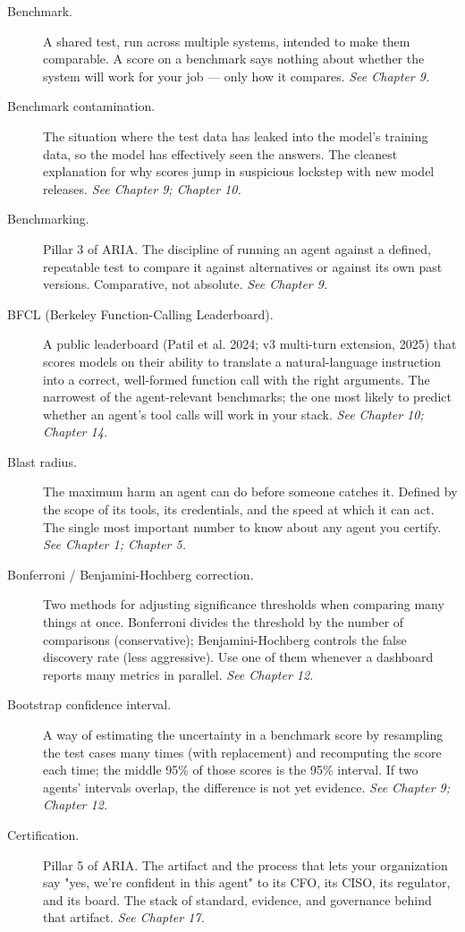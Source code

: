 \begin{description}
  \item[Benchmark.] A shared test, run across multiple systems, intended to make them comparable. A score on a benchmark says nothing about whether the system will work for your job — only how it compares. \textit{See Chapter 9.}
  \item[Benchmark contamination.] The situation where the test data has leaked into the model's training data, so the model has effectively seen the answers. The cleanest explanation for why scores jump in suspicious lockstep with new model releases. \textit{See Chapter 9; Chapter 10.}
  \item[Benchmarking.] Pillar 3 of ARIA. The discipline of running an agent against a defined, repeatable test to compare it against alternatives or against its own past versions. Comparative, not absolute. \textit{See Chapter 9.}
  \item[BFCL (Berkeley Function-Calling Leaderboard).] A public leaderboard (Patil et al. 2024; v3 multi-turn extension, 2025) that scores models on their ability to translate a natural-language instruction into a correct, well-formed function call with the right arguments. The narrowest of the agent-relevant benchmarks; the one most likely to predict whether an agent's tool calls will work in your stack. \textit{See Chapter 10; Chapter 14.}
  \item[Blast radius.] The maximum harm an agent can do before someone catches it. Defined by the scope of its tools, its credentials, and the speed at which it can act. The single most important number to know about any agent you certify. \textit{See Chapter 1; Chapter 5.}
  \item[Bonferroni / Benjamini-Hochberg correction.] Two methods for adjusting significance thresholds when comparing many things at once. Bonferroni divides the threshold by the number of comparisons (conservative); Benjamini-Hochberg controls the false discovery rate (less aggressive). Use one of them whenever a dashboard reports many metrics in parallel. \textit{See Chapter 12.}
  \item[Bootstrap confidence interval.] A way of estimating the uncertainty in a benchmark score by resampling the test cases many times (with replacement) and recomputing the score each time; the middle 95\% of those scores is the 95\% interval. If two agents' intervals overlap, the difference is not yet evidence. \textit{See Chapter 9; Chapter 12.}
  \item[Certification.] Pillar 5 of ARIA. The artifact and the process that lets your organization say "yes, we're confident in this agent" to its CFO, its CISO, its regulator, and its board. The stack of standard, evidence, and governance behind that artifact. \textit{See Chapter 17.}

\end{description}

